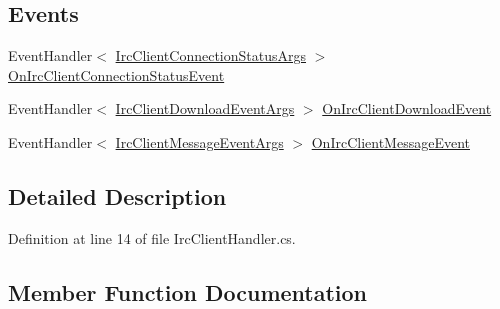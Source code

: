 \subsection*{Events}
\begin{DoxyCompactItemize}
\item 
Event\+Handler$<$ \mbox{\hyperlink{class_little_weeb_library_1_1_event_arguments_1_1_irc_client_connection_status_args}{Irc\+Client\+Connection\+Status\+Args}} $>$ \mbox{\hyperlink{interface_little_weeb_library_1_1_handlers_1_1_i_irc_client_handler_aa5c6de48e7174db5e954a98bc7f51428}{On\+Irc\+Client\+Connection\+Status\+Event}}
\item 
Event\+Handler$<$ \mbox{\hyperlink{class_little_weeb_library_1_1_event_arguments_1_1_irc_client_download_event_args}{Irc\+Client\+Download\+Event\+Args}} $>$ \mbox{\hyperlink{interface_little_weeb_library_1_1_handlers_1_1_i_irc_client_handler_a613d3077c0296d53b1b5e13931b9a0e5}{On\+Irc\+Client\+Download\+Event}}
\item 
Event\+Handler$<$ \mbox{\hyperlink{class_little_weeb_library_1_1_event_arguments_1_1_irc_client_message_event_args}{Irc\+Client\+Message\+Event\+Args}} $>$ \mbox{\hyperlink{interface_little_weeb_library_1_1_handlers_1_1_i_irc_client_handler_a11c263a58db1c4077ddbfffeb7fea46b}{On\+Irc\+Client\+Message\+Event}}
\end{DoxyCompactItemize}


\subsection{Detailed Description}


Definition at line 14 of file Irc\+Client\+Handler.\+cs.



\subsection{Member Function Documentation}
\mbox{\label{interface_little_weeb_library_1_1_handlers_1_1_i_irc_client_handler_aa9da8681f056b8122ad56c586a78fed0}} 
